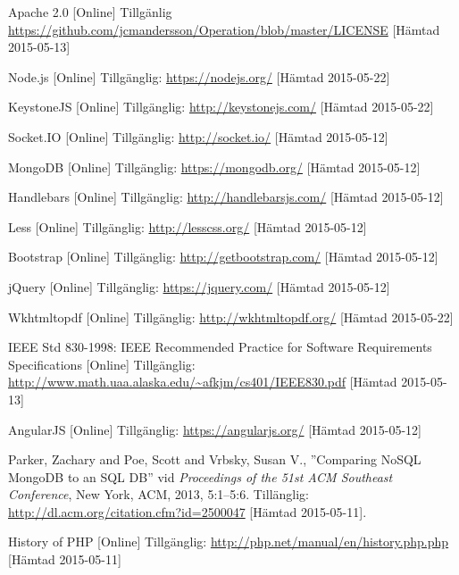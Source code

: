 \vspace{-15mm}
\renewcommand{\refname}{}
\begin{thebibliography}{9}


Apache 2.0 [Online] Tillgänlig \url{https://github.com/jcmandersson/Operation/blob/master/LICENSE} [Hämtad 2015-05-13]

Node.js [Online] Tillgänglig:
\url{https://nodejs.org/} [Hämtad 2015-05-22]

KeystoneJS [Online] Tillgänglig:
\url{http://keystonejs.com/} [Hämtad 2015-05-22]

Socket.IO [Online] Tillgänglig: 
\url{http://socket.io/} [Hämtad 2015-05-12]

MongoDB [Online] Tillgänglig: 
\url{https://mongodb.org/} [Hämtad 2015-05-12]

Handlebars [Online] Tillgänglig: 
\url{http://handlebarsjs.com/} [Hämtad 2015-05-12]

Less [Online] Tillgänglig: 
\url{http://lesscss.org/} [Hämtad 2015-05-12]

Bootstrap [Online] Tillgänglig: 
\url{http://getbootstrap.com/} [Hämtad 2015-05-12]

jQuery [Online] Tillgänglig: 
\url{https://jquery.com/} [Hämtad 2015-05-12]

Wkhtmltopdf [Online] Tillgänglig:
\url{http://wkhtmltopdf.org/} [Hämtad 2015-05-22]

IEEE Std 830-1998: IEEE Recommended Practice for Software Requirements Specifications [Online] Tillgänglig:
\url{http://www.math.uaa.alaska.edu/~afkjm/cs401/IEEE830.pdf} [Hämtad 2015-05-13]

AngularJS [Online] Tillgänglig: 
\url{https://angularjs.org/} [Hämtad 2015-05-12]

 Parker, Zachary and Poe, Scott and Vrbsky, Susan V., ''Comparing NoSQL MongoDB to an SQL DB'' vid \textit{Proceedings of the 51st ACM Southeast Conference}, New York, ACM, 2013, 5:1--5:6. Tillänglig: \url{http://dl.acm.org/citation.cfm?id=2500047} [Hämtad 2015-05-11].

History of PHP [Online] Tillgänglig:
\url{http://php.net/manual/en/history.php.php}
[Hämtad 2015-05-11]
	

\end{thebibliography}
